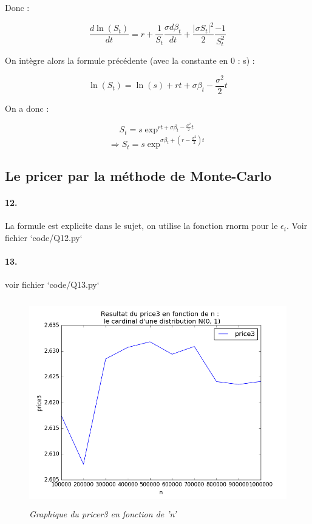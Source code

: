 \documentclass[10pt]{article}
\begin{document}
  Donc :
  
  $$ \frac{d\ln(S_t)}{dt} = r + \frac{1}{S_t}\frac{\sigma d \beta_t}{dt} + \frac{|\sigma S_t|^2}{2}\frac{-1}{S_t^2} $$
  
  On intègre alors la formule précédente (avec la constante en 0 : s) :
  
  $$ \ln(S_t) = \ln(s) + rt + \sigma \beta_t - \frac{\sigma^2}{2}t $$
  
  On a donc :
  
  $$ S_t = s\exp^{rt + \sigma \beta_t - \frac{\sigma^2}{2}t} $$
  $$ \Rightarrow \boxed{S_t = s\exp^{\sigma \beta_t + (r-\frac{\sigma^2}{2})t}} $$
  
  \subsection{Le pricer par la méthode de Monte-Carlo}
  \paragraph{12.}La formule est explicite dans le sujet, on utilise la fonction rnorm pour le $\epsilon_i$.  Voir fichier `code/Q12.py`
  
  \paragraph{13.} voir fichier `code/Q13.py`
  
  \begin{figure}[H]
    \begin{center}
      \includegraphics[height=9cm,keepaspectratio]{./images/q13.png}
    \end{center}
    \caption{\textit{Graphique du pricer3 en fonction de 'n'}}
    \label{q13}
  \end{figure}
  
\end{document}
